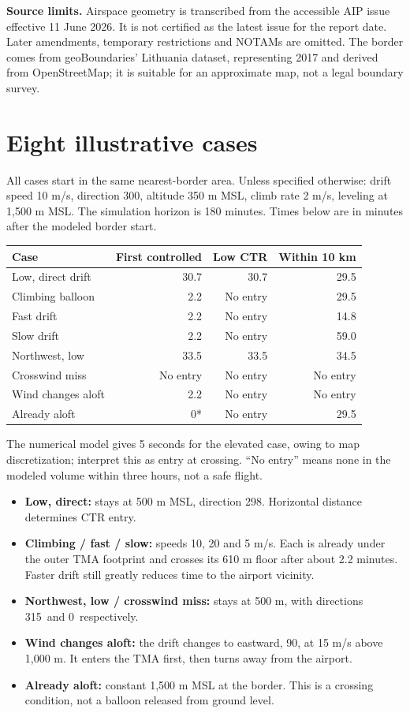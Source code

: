 \documentclass[11pt,a4paper]{article}
\begin{document}
\textbf{Source limits.} Airspace geometry is transcribed from the accessible AIP issue effective 11 June 2026. It is not certified as the latest issue for the report date. Later amendments, temporary restrictions and NOTAMs are omitted. The border comes from geoBoundaries' Lithuania dataset, representing 2017 and derived from OpenStreetMap; it is suitable for an approximate map, not a legal boundary survey.

\newpage
\section*{Eight illustrative cases}
All cases start in the same nearest-border area. Unless specified otherwise: drift speed 10 m/s, direction 300\textdegree, altitude 350 m MSL, climb rate 2 m/s, leveling at 1,500 m MSL. The simulation horizon is 180 minutes. Times below are in minutes after the modeled border start.

\begin{center}\small
\begin{tabular}{p{54mm}rrr}\toprule
Case & First controlled & Low CTR & Within 10 km\\\midrule
Low, direct drift & 30.7 & 30.7 & 29.5 \\
Climbing balloon & 2.2 & No entry & 29.5 \\
Fast drift & 2.2 & No entry & 14.8 \\
Slow drift & 2.2 & No entry & 59.0 \\
Northwest, low & 33.5 & 33.5 & 34.5 \\
Crosswind miss & No entry & No entry & No entry \\
Wind changes aloft & 2.2 & No entry & No entry \\
Already aloft & 0* & No entry & 29.5 \\
\bottomrule\end{tabular}\end{center}
{\small *The numerical model gives 5 seconds for the elevated case, owing to map discretization; interpret this as entry at crossing. ``No entry'' means none in the modeled volume within three hours, not a safe flight.}

\begin{itemize}
\item \textbf{Low, direct:} stays at 500 m MSL, direction 298\textdegree. Horizontal distance determines CTR entry.
\item \textbf{Climbing / fast / slow:} speeds 10, 20 and 5 m/s. Each is already under the outer TMA footprint and crosses its 610 m floor after about 2.2 minutes. Faster drift still greatly reduces time to the airport vicinity.
\item \textbf{Northwest, low / crosswind miss:} stays at 500 m, with directions 315\textdegree\ and 0\textdegree\ respectively.
\item \textbf{Wind changes aloft:} the drift changes to eastward, 90\textdegree, at 15 m/s above 1,000 m. It enters the TMA first, then turns away from the airport.
\item \textbf{Already aloft:} constant 1,500 m MSL at the border. This is a crossing condition, not a balloon released from ground level.
\end{itemize}
\end{document}
